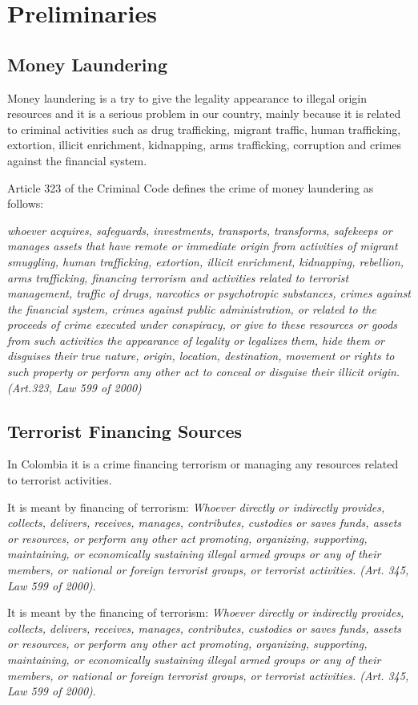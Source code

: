 \chapter{Preliminaries}
\label{chap:Preliminaries}
\section{Money Laundering }

Money laundering is a try to give the legality appearance to illegal origin resources and it is a serious problem in our country, mainly because it is related to criminal activities such as drug trafficking, migrant traffic, human trafficking, extortion, illicit enrichment, kidnapping, arms trafficking, corruption and crimes against the financial system.\par
Article 323 of the Criminal Code defines the crime of money laundering as follows:\par
\textit{whoever acquires, safeguards, investments, transports, transforms, safekeeps or manages assets that have remote or immediate origin from activities of migrant smuggling, human trafficking, extortion, illicit enrichment, kidnapping, rebellion, arms trafficking, financing terrorism and activities related to terrorist management, traffic of drugs, narcotics or psychotropic substances, crimes against the financial system, crimes against public administration, or related to the proceeds of crime executed under conspiracy, or give to these resources or goods from such activities the appearance of legality or legalizes them, hide them or disguises their true nature, origin, location, destination, movement or rights to such property or perform any other act to conceal or disguise their illicit origin. (Art.323, Law 599 of 2000)}
\section{Terrorist Financing Sources}
In Colombia it is a crime financing terrorism or managing any resources related to terrorist activities.\par
It is meant by financing of terrorism: \emph{Whoever directly or indirectly provides, collects, delivers, receives, manages, contributes, custodies or saves funds, assets or resources, or perform any other act promoting, organizing, supporting, maintaining, or economically sustaining illegal armed groups or any of their members, or national or foreign terrorist groups, or terrorist activities. (Art. 345, Law 599 of 2000)}.\par
It is meant by the financing of terrorism: \emph{Whoever directly or indirectly provides, collects, delivers, receives, manages, contributes, custodies or saves funds, assets or resources, or perform any other act promoting, organizing, supporting, maintaining, or economically sustaining illegal armed groups or any of their members, or national or foreign terrorist groups, or terrorist activities. (Art. 345, Law 599 of 2000)}.\par

